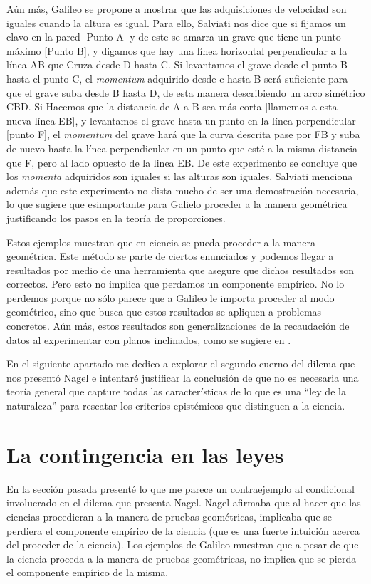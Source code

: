 Aún más, Galileo se propone a mostrar que las adquisiciones de velocidad son iguales cuando la altura es igual. Para ello, Salviati \cite[p. 232]{galtre} nos dice que si fijamos un clavo en la pared [Punto A] y de este se amarra un grave que tiene un punto máximo [Punto B], y digamos que hay una línea horizontal perpendicular a la línea AB que Cruza desde D hasta C. Si levantamos el grave desde el punto B hasta el punto C, el \textit{momentum} adquirido desde c hasta B será suficiente para que el grave suba desde B hasta D, de esta manera describiendo un arco simétrico CBD. Si Hacemos que la distancia de A a B sea más corta [llamemos a esta nueva línea EB], y levantamos el grave hasta un punto en la línea perpendicular [punto F], el \textit{momentum} del grave hará que la curva descrita pase por FB y suba de nuevo hasta la línea perpendicular en un punto que esté a la misma distancia que F, pero al lado opuesto de la linea EB. De este experimento se concluye que los \textit{momenta} adquiridos son iguales si las alturas son iguales. Salviati menciona además que este experimento no dista mucho de ser una demostración necesaria, lo que sugiere que esimportante para Galielo proceder a la manera geométrica justificando los pasos en la teoría de proporciones.

Estos ejemplos muestran que en ciencia se pueda proceder a la manera geométrica. Este método se parte de ciertos enunciados y podemos llegar a resultados por medio de una herramienta que asegure que dichos resultados son correctos. Pero esto no implica que perdamos un componente empírico. No lo perdemos porque no sólo parece que a Galileo le importa proceder al modo geométrico, sino que busca que estos resultados se apliquen a problemas concretos. Aún más, estos resultados son generalizaciones de la recaudación de datos al experimentar con planos inclinados, como se sugiere en \cite[p. 231]{galtre}.

En el siguiente apartado me dedico a explorar el segundo cuerno del dilema que nos presentó Nagel e intentaré justificar la conclusión de que no es necesaria una teoría general que capture todas las características de lo que es una ``ley de la naturaleza'' para rescatar los criterios epistémicos que distinguen a la ciencia.

\section{La contingencia en las leyes}

\noindent En la sección pasada presenté lo que me parece un contraejemplo al condicional involucrado en el dilema que presenta Nagel. Nagel afirmaba que al hacer que las ciencias procedieran a la manera de pruebas geométricas, implicaba que se perdiera el componente empírico de la ciencia (que es una fuerte intuición acerca del proceder de la ciencia). Los ejemplos de Galileo muestran que a pesar de que la ciencia proceda a la manera de pruebas geométricas, no implica que se pierda el componente empírico de la misma.

